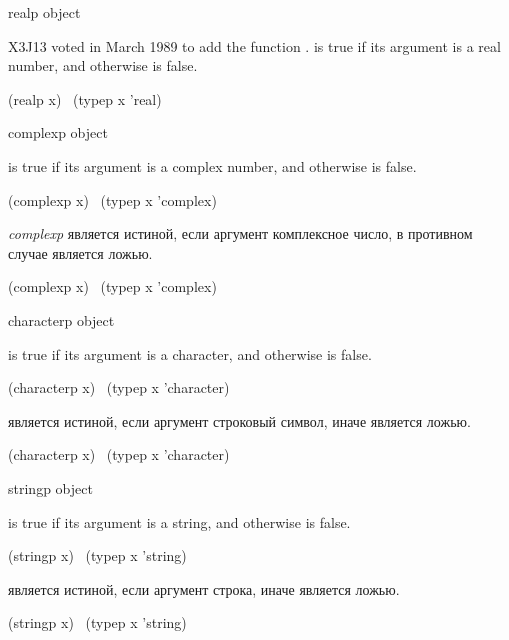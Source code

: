 \begin{newer}
\begin{defun}[Function]
realp object

X3J13 voted in March 1989  to add the function .
 is true if its argument is a real number,
and otherwise is false.
\begin{lisp}
(realp x) \EQ\ (typep x 'real)
\end{lisp}
\end{defun}
\end{newer}

\begin{defun}[Function]
complexp object

 is true if its argument is a complex number,
and otherwise is false.
\begin{lisp}
(complexp x) \EQ\ (typep x 'complex)
\end{lisp}

\emph{complexp} является истиной, если аргумент комплексное число, в противном
случае является ложью.
\begin{lisp}
(complexp x) \EQ\ (typep x 'complex)
\end{lisp}
\end{defun}

\begin{defun}[Function]
characterp object

 is true if its argument is a character,
and otherwise is false.
\begin{lisp}
(characterp x) \EQ\ (typep x 'character)
\end{lisp}

 является истиной, если аргумент строковый символ, иначе
является ложью.
\begin{lisp}
(characterp x) \EQ\ (typep x 'character)
\end{lisp}
\end{defun}

\begin{defun}[Function]
stringp object

 is true if its argument is a string,
and otherwise is false.
\begin{lisp}
(stringp x) \EQ\ (typep x 'string)
\end{lisp}

 является истиной, если аргумент строка, иначе является ложью.
\begin{lisp}
(stringp x) \EQ\ (typep x 'string)
\end{lisp}
\end{defun}

